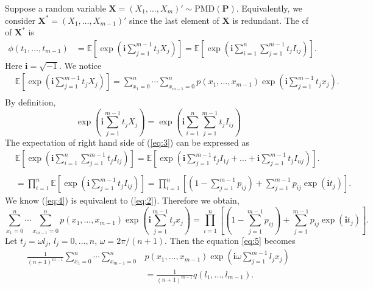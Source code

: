 \documentclass[12pt]{article}
\newcommand{\EE}{\mathbb{E}}
\newcommand{\Pmat}{\mathbf{P}}
\newcommand{\ivec}{{\boldsymbol{i}}}
\newcommand{\PMD}{\textrm{PMD}}
\newcommand{\Xvec}{\boldsymbol{X}}
\begin{document}
Suppose a random variable $\Xvec =  (X_1, \dots, X_{m})' \sim \PMD(\Pmat)$. Equivalently, we consider $\Xvec^{\ast} = (X_1, \dots, X_{m-1})'$ since the last element of $\Xvec$ is redundant. The cf of $\Xvec^{\ast}$ is
\begin{align}
\phi(t_1, \dots, t_{m-1}) & = \EE\left[\exp\left(\ivec\sum_{j=1}^{m-1}t_jX_j\right)\right]=\EE\left[\exp\left(\ivec\sum_{i = 1}^n \sum_{j=1}^{m-1}t_j I_{ij}\right)\right].
\end{align}
Here $\ivec=\sqrt{-1}$. We notice
\begin{equation}\label{eq:2}
\begin{split}
  &\EE\left[\exp\left(\ivec\sum_{j=1}^{m-1}t_jX_j\right)\right] = \sum_{x_1 = 0}^{n}\cdots \sum_{x_{m-1} = 0}^n p(x_1,\ldots,x_{m-1})\exp\left(\ivec\sum_{j=1}^{m-1}t_jx_j\right).\\
\end{split}
\end{equation}
By definition,
\begin{equation}\label{eq:3}
\exp\left(\ivec\sum_{j=1}^{m-1}t_jX_j\right)= \exp\left(\ivec\sum_{i = 1}^n \sum_{j=1}^{m-1}t_j I_{ij}\right)
\end{equation}
The expectation of right hand side of (\ref{eq:3}) can be expressed as
\begin{equation}\label{eq:4}
\begin{split}
  &\EE\left[\exp\left(\ivec\sum_{i = 1}^n \sum_{j=1}^{m-1}t_j I_{ij}\right)\right] = \EE\left[ \exp\left( \ivec\sum_{j=1}^{m-1} t_jI_{1j} + \dots + \ivec\sum_{j=1}^{m-1} t_jI_{nj}\right)\right].\\
  \\
  & = \prod_{i=1}^n \EE\left[ \exp\left( \ivec \sum_{j=1}^{m-1} t_j I_{ij}\right)\right] = \prod_{i=1}^n \left[(1 - \sum_{j=1}^{m-1}p_{ij})+\sum_{j=1}^{m-1}p_{ij}\exp(\ivec t_j)\right].
\end{split}
\end{equation}
We know (\ref{eq:4}) is equivalent to (\ref{eq:2}). Therefore we obtain,
\begin{equation}\label{eq:5}
\sum_{x_1 = 0}^{n}\cdots \sum_{x_{m-1} = 0}^n p(x_1,\ldots,x_{m-1})\exp\left(\ivec\sum_{j=1}^{m-1}t_jx_j\right)= \prod_{i=1}^{n}\left[(1 - \sum_{j=1}^{m-1}p_{ij})+\sum_{j=1}^{m-1}p_{ij}\exp(\ivec t_j)\right].
\end{equation}
Let $t_j = \omega l_j$, $l_j = 0, \ldots, n$, $\omega = 2\pi/(n+1)$. Then the equation \eqref{eq:5} becomes
\begin{align}\label{eq:6}
\frac{1}{(n+1)^{m-1}} \sum_{x_1 = 0}^{n}\cdots \sum_{x_{m-1} = 0}^n & p(x_1,\ldots,x_{m-1}) \exp\left(\ivec\omega\sum_{j=1}^{m-1}l_j x_j\right)\\\nonumber
&= \frac{1}{(n+1)^{m-1}} q(l_1, \ldots, l_{m-1}).
\end{align}
\end{document}
